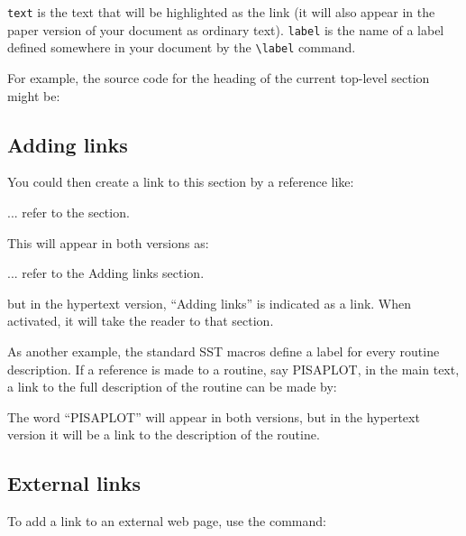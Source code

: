 \documentclass[twoside,11pt,nolof]{starlink}
\begin{document}
\texttt{text} is the text that will be highlighted as the link (it will also
appear in the paper version of your document as ordinary text).
\texttt{label} is the name of a label defined somewhere in your document by
the \verb#\label# command.

For example, the source code for the heading of the current top-level section
might be:

\begin{terminalv}
\section{\label{adding_links}Adding links}
\end{terminalv}

You could then create a link to this section by a reference like:

\begin{terminalv}
... refer to the  section.
\end{terminalv}

This will appear in both versions as:

\begin{terminalv}
... refer to the Adding links section.
\end{terminalv}

but in the hypertext version, ``Adding links'' is indicated as a link.
When activated, it will take the reader to that section.

As another example, the standard SST macros define a label for every routine
description.
If a reference is made to a routine, say PISAPLOT, in the main text, a link
to the full description of the routine can be made by:

\begin{terminalv}
\end{terminalv}

The word ``PISAPLOT'' will appear in both versions, but in the hypertext version
it will be a link to the description of the routine.

\subsection{External links}

To add a link to an external web page, use the command:

\begin{terminalv}
\end{terminalv}
\end{document}
